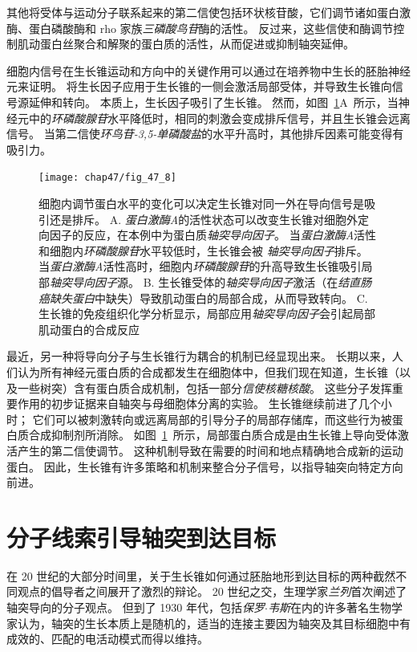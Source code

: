 其他将受体与运动分子联系起来的第二信使包括环状核苷酸，它们调节诸如蛋白激酶、蛋白磷酸酶和 rho 家族\textit{三磷酸鸟苷}酶的活性。
反过来，这些信使和酶调节控制肌动蛋白丝聚合和解聚的蛋白质的活性，从而促进或抑制轴突延伸。


细胞内信号在生长锥运动和方向中的关键作用可以通过在培养物中生长的胚胎神经元来证明。
将生长因子应用于生长锥的一侧会激活局部受体，并导致生长锥向信号源延伸和转向。
本质上，生长因子吸引了生长锥。
然而，如图~\ref{fig:47_8}A~所示，当神经元中的\textit{环磷酸腺苷}水平降低时，相同的刺激会变成排斥信号，并且生长锥会远离信号。
当第二信使\textit{环鸟苷-3,5-单磷酸盐}的水平升高时，其他排斥因素可能变得有吸引力。


\begin{figure}[htbp]
	\centering
	\texttt{[image: chap47/fig\_47\_8]}
	\caption{细胞内调节蛋白水平的变化可以决定生长锥对同一外在导向信号是吸引还是排斥。
		A. \textit{蛋白激酶A}的活性状态可以改变生长锥对细胞外定向因子的反应，在本例中为蛋白质\textit{轴突导向因子}。
		当\textit{蛋白激酶A}活性和细胞内\textit{环磷酸腺苷}水平较低时，生长锥会被 \textit{轴突导向因子}排斥。
		当\textit{蛋白激酶A}活性高时，细胞内\textit{环磷酸腺苷}的升高导致生长锥吸引局部\textit{轴突导向因子}源\cite{ming1997camp}。
		B. 生长锥受体的\textit{轴突导向因子}激活（在\textit{结直肠癌缺失蛋白}中缺失）导致肌动蛋白的局部合成，从而导致转向。
		C. 生长锥的免疫组织化学分析显示，局部应用\textit{轴突导向因子}会引起局部肌动蛋白的合成反应\cite{leung2006asymmetrical} }
	\label{fig:47_8}
\end{figure}


最近，另一种将导向分子与生长锥行为耦合的机制已经显现出来。
长期以来，人们认为所有神经元蛋白质的合成都发生在细胞体中，但我们现在知道，生长锥（以及一些树突）含有蛋白质合成机制，包括一部分\textit{信使核糖核酸}。
这些分子发挥重要作用的初步证据来自轴突与母细胞体分离的实验。
生长锥继续前进了几个小时； 它们可以被刺激转向或远离局部的引导分子的局部存储库，而这些行为被蛋白质合成抑制剂所消除。
如图~\ref{fig:47_8}~所示，局部蛋白质合成是由生长锥上导向受体激活产生的第二信使调节。
这种机制导致在需要的时间和地点精确地合成新的运动蛋白。
因此，生长锥有许多策略和机制来整合分子信号，以指导轴突向特定方向前进。



\section{分子线索引导轴突到达目标}

在 20 世纪的大部分时间里，关于生长锥如何通过胚胎地形到达目标的两种截然不同观点的倡导者之间展开了激烈的辩论。
20 世纪之交，生理学家\textit{兰列}首次阐述了轴突导向的分子观点。
但到了 1930 年代，包括\textit{保罗$\cdot$韦斯}在内的许多著名生物学家认为，轴突的生长本质上是随机的，适当的连接主要因为轴突及其目标细胞中有成效的、匹配的电活动模式而得以维持。


